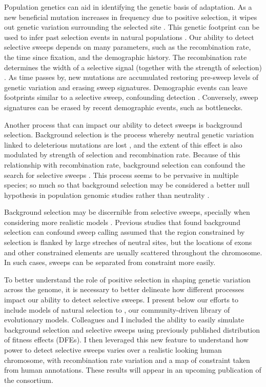 Population genetics can aid in identifying the genetic basis of adaptation.
As a new beneficial mutation increases in frequency due to positive selection,
it wipes out genetic variation surrounding the selected site \citep{smith_hitch-hiking_1974, kaplan_hitchhiking_1989}.
This genetic footprint can be used to infer past selection events in natural populations \citep{nielsen_estimation_2000, hernandez_classic_2011, garud_recent_2015, schrider_soft_2017, przeworski_signature_2002, enard_genome-wide_2014, williamson_evidence_2014}.
Our ability to detect selective sweeps depends on many parameters, such as the recombination rate, the time since fixation, and the demographic history.
The recombination rate determines the width of a selective signal (together with the strength of selection) \citep{kaplan_hitchhiking_1989}.
As time passes by, new mutations are accumulated restoring pre-sweep levels of genetic variation and erasing sweep signatures.
Demographic events can leave footprints similar to a selective sweep, confounding detection \citep{przeworski_signature_2002, jensen_distinguishing_2005}.
Conversely, sweep signatures can be erased by recent demographic events, such as bottlenecks.

Another process that can impact our ability to detect sweeps is background selection.
Background selection is the process whereby neutral genetic variation linked to deleterious mutations are lost \citep{charlesworth_effect_1993}, and the extent of this effect is also modulated by strength of selection and recombination rate.
Because of this relationship with recombination rate, background selection can confound the search for selective sweeps \citep{andolfatto_adaptive_2001}.
This process seems to be pervasive in multiple species; so much so that background selection may be considered a better null hypothesis in population genomic studies rather than neutrality \citep{comeron_background_2017}.

Background selection may be discernible from selective sweeps, specially when considering more realistic models \citep{schrider_background_2020}.
Previous studies that found background selection can confound sweep calling assumed that the region constrained by selection is flanked by large streches of neutral sites,
but the locations of exons and other constrained elements are usually scattered throughout the chromosome.
In such cases, sweeps can be separated from constraint more easily.

To better understand the role of positive selection in shaping genetic variation across the genome,
it is necessary to better delineate how different processes impact our ability to detect selective sweeps.
I present below our efforts to include models of natural selection to \stdpopsim, our community-driven library of evolutionary models.
Colleagues and I included the ability to easily simulate background selection and selective sweeps using previously published distribution of fitness effects (DFEs).
I then leveraged this new feature to understand how power to detect selective sweeps varies over a realistic looking human chromosome,
with recombination rate variation and a map of constraint taken from human annotations.
These results will appear in an upcoming publication of the \stdpopsim consortium.

